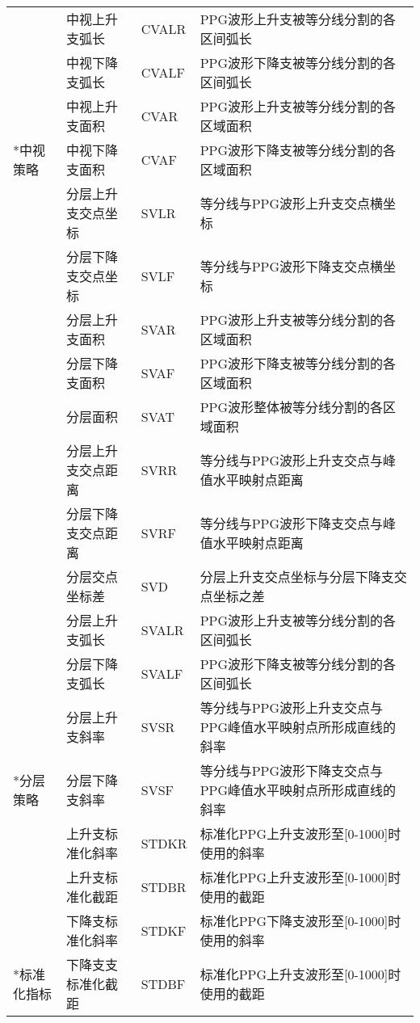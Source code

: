 \begin{center}
\begin{longtable}{m{1.5cm}<{\centering}m{3.5cm}<{\centering}m{2cm}<{\centering}m{8cm}<{\centering}}
         &     中视上升支弧长 & CVALR & PPG波形上升支被等分线分割的各区间弧长 \\
         &     中视下降支弧长 & CVALF & PPG波形下降支被等分线分割的各区间弧长 \\
         &     中视上升支面积 & CVAR & PPG波形上升支被等分线分割的各区域面积 \\
         \multirow{-5}*{中视策略} &     中视下降支面积 & CVAF & PPG波形下降支被等分线分割的各区域面积 \\
         &     分层上升支交点坐标 & SVLR & 等分线与PPG波形上升支交点横坐标 \\
         &     分层下降支交点坐标 & SVLF & 等分线与PPG波形下降支交点横坐标 \\
         &     分层上升支面积 & SVAR & PPG波形上升支被等分线分割的各区域面积 \\
         &     分层下降支面积 & SVAF & PPG波形下降支被等分线分割的各区域面积 \\
         &     分层面积 & SVAT & PPG波形整体被等分线分割的各区域面积 \\
         &     分层上升支交点距离 & SVRR & 等分线与PPG波形上升支交点与峰值水平映射点距离 \\
         &     分层下降支交点距离 & SVRF & 等分线与PPG波形下降支交点与峰值水平映射点距离 \\
         &     分层交点坐标差 & SVD &  分层上升支交点坐标与分层下降支交点坐标之差\\
         &     分层上升支弧长 & SVALR & PPG波形上升支被等分线分割的各区间弧长 \\
         &     分层下降支弧长 & SVALF & PPG波形下降支被等分线分割的各区间弧长 \\
         &     分层上升支斜率 & SVSR & 等分线与PPG波形上升支交点与PPG峰值水平映射点所形成直线的斜率\\
         \multirow{-12}*{分层策略} & 分层下降支斜率 & SVSF & 等分线与PPG波形下降支交点与PPG峰值水平映射点所形成直线的斜率 \\
         &     上升支标准化斜率 & STDKR & 标准化PPG上升支波形至[0-1000]时使用的斜率 \\
         &     上升支标准化截距 & STDBR & 标准化PPG上升支波形至[0-1000]时使用的截距 \\
         &     下降支标准化斜率& STDKF & 标准化PPG下降支波形至[0-1000]时使用的斜率 \\
         \multirow{-4}*{标准化指标}   &  下降支支标准化截距 & STDBF & 标准化PPG上升支波形至[0-1000]时使用的截距 \\
  \end{longtable}
\end{center}
\vspace{-1.2cm} 
